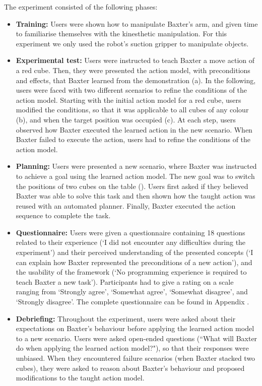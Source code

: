 The experiment consisted of the following phases:
\begin{itemize}
  \item{\textbf{Training:} Users were shown how to manipulate Baxter's arm, and given time to familiarise themselves with the kinesthetic manipulation. 
  	For this experiment we only used the robot's suction gripper to manipulate objects.}
  \item{\textbf{Experimental test:} Users were instructed to teach Baxter a move action of a red cube. 
  	Then, they were presented the action model, with preconditions and effects, that Baxter learned from the demonstration (a). 
  	In the following, users were faced with two different scenarios to refine the conditions of the action model. 
  	Starting with the initial action model for a red cube, users modified the conditions, so that it was applicable to all cubes of any colour (b), and when the target position was occupied (c). 
  	At each step, users observed how Baxter executed the learned action in the new scenario. 
  	When Baxter failed to execute the action, users had to refine the conditions of the action model.}
  \item{\textbf{Planning:} Users were presented a new scenario, where Baxter was instructed to achieve a goal using the learned action model. 
  	The new goal was to switch the positions of two cubes on the table (). 
  	Users first asked if they believed Baxter was able to solve this task and then shown how the taught action was reused with an automated planner.
  	Finally, Baxter executed the action sequence to complete the task.}
  \item{\textbf{Questionnaire:} Users were given a questionnaire containing 18 questions related to their experience (\eg `I did not encounter any difficulties during the experiment') and their perceived understanding of the presented concepts (\eg `I can explain how Baxter represented the preconditions of a new action'), and the usability of the framework (\eg `No programming experience is required to teach Baxter a new task').
  Participants had to give a rating on a scale ranging from `Strongly agree', `Somewhat agree', `Somewhat disagree', and `Strongly disagree'.
  The complete questionnaire can be found in Appendix .}
   \item{ \textbf{Debriefing:} Throughout the experiment, users were asked about their expectations on Baxter's behaviour before applying the learned action model to a new scenario. 
   	Users were asked open-ended questions (\eg ``What will Baxter do when applying the learned action model?"), so that their responses were unbiased. 
   	When they encountered failure scenarios (\eg when Baxter stacked two cubes), they were asked to reason about Baxter's behaviour and proposed modifications to the taught action model.} 
\end{itemize}

